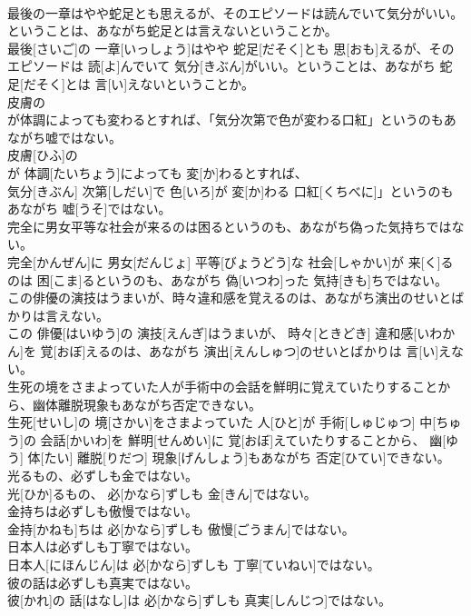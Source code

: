 \documentclass[8pt]{extreport}
\begin{document}
\begin{CJK}{UTF8}{min}
\\	最後の一章はやや蛇足とも思えるが、そのエピソードは読んでいて気分がいい。ということは、あながち蛇足とは言えないということか。	
\\	最後[さいご]の 一章[いっしょう]はやや 蛇足[だそく]とも 思[おも]えるが、そのエピソードは 読[よ]んでいて 気分[きぶん]がいい。ということは、あながち 蛇足[だそく]とは 言[い]えないということか。
\\	皮膚の
\\	が体調によっても変わるとすれば、「気分次第で色が変わる口紅」というのもあながち嘘ではない。	
\\	皮膚[ひふ]の 
\\	が 体調[たいちょう]によっても 変[か]わるとすれば、
\\	気分[きぶん] 次第[しだい]で 色[いろ]が 変[か]わる 口紅[くちべに]」というのもあながち 嘘[うそ]ではない。
\\	完全に男女平等な社会が来るのは困るというのも、あながち偽った気持ちではない。	
\\	完全[かんぜん]に 男女[だんじょ] 平等[びょうどう]な 社会[しゃかい]が 来[く]るのは 困[こま]るというのも、あながち 偽[いつわ]った 気持[きも]ちではない。
\\	この俳優の演技はうまいが、時々違和感を覚えるのは、あながち演出のせいとばかりは言えない。	
\\	この 俳優[はいゆう]の 演技[えんぎ]はうまいが、 時々[ときどき] 違和感[いわかん]を 覚[おぼ]えるのは、あながち 演出[えんしゅつ]のせいとばかりは 言[い]えない。
\\	生死の境をさまよっていた人が手術中の会話を鮮明に覚えていたりすることから、幽体離脱現象もあながち否定できない。	
\\	生死[せいし]の 境[さかい]をさまよっていた 人[ひと]が 手術[しゅじゅつ] 中[ちゅう]の 会話[かいわ]を 鮮明[せんめい]に 覚[おぼ]えていたりすることから、 幽[ゆう] 体[たい] 離脱[りだつ] 現象[げんしょう]もあながち 否定[ひてい]できない。
\\	光るもの、必ずしも金ではない。	
\\	光[ひか]るもの、 必[かなら]ずしも 金[きん]ではない。
\\	金持ちは必ずしも傲慢ではない。	
\\	金持[かねも]ちは 必[かなら]ずしも 傲慢[ごうまん]ではない。
\\	日本人は必ずしも丁寧ではない。	
\\	日本人[にほんじん]は 必[かなら]ずしも 丁寧[ていねい]ではない。
\\	彼の話は必ずしも真実ではない。	
\\	彼[かれ]の 話[はなし]は 必[かなら]ずしも 真実[しんじつ]ではない。

\end{CJK}
\end{document}
